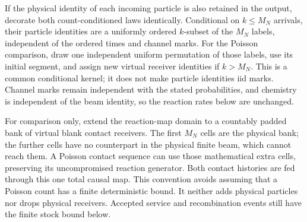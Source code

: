 \documentclass[11pt]{article}
\theoremstyle{definition}\newtheorem{definition}[theorem]{Definition}
\theoremstyle{remark}\newtheorem{remark}[theorem]{Remark}
\begin{document}
If the physical identity of each incoming particle is also retained in
the output, decorate both count-conditioned laws identically.  Conditional
on $k\le M_N$ arrivals, their particle identities are a uniformly ordered
$k$-subset of the $M_N$ labels, independent of the ordered times and
channel marks.  For the Poisson comparison, draw one independent uniform
permutation of those labels, use its initial segment, and assign new
virtual receiver identities if $k>M_N$.  This is a common conditional
kernel; it does not make particle identities iid marks.  Channel marks
remain independent with the stated probabilities, and chemistry is
independent of the beam identity, so the reaction rates below are unchanged.

For comparison only, extend the reaction-map domain to a countably padded bank of virtual blank contact receivers. The first $M_N$ cells are the physical bank; the further cells have no counterpart in the physical finite beam, which cannot reach them. A Poisson contact sequence can use those mathematical extra cells, preserving its uncompromised reaction generator. Both contact histories are fed through this one total causal map. This convention avoids assuming that a Poisson count has a finite deterministic bound. It neither adds physical particles nor drops physical receivers. Accepted service and recombination events still have the finite stock bound below.
\end{document}
